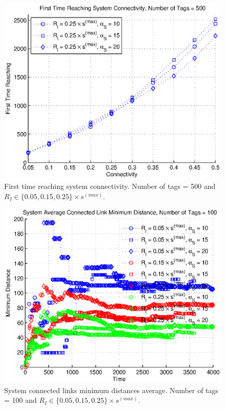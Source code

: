 \begin{figure}
\centering
\includegraphics[width=5in]{Chapter_4_Figures/sys_first_time_connect_500tags.eps}
\caption{First time reaching system connectivity. Number of tags = 500 and $R_I \in \{0.05, 0.15, 0.25\} \times s^{(max)}$.}
\label{Figure: sys_first_time_connect_500tags.eps}
\end{figure}
\begin{figure}
\centering
\includegraphics[width=5in]{Chapter_4_Figures/sys_links_min_dist_100tags_all.eps}
\caption{System connected links minimum distances average. Number of tags = 100 and $R_I \in \{0.05, 0.15, 0.25\} \times s^{(max)}$.}
\label{Figure: sys_links_min_dist_100tags_all.eps}
\end{figure}
\clearpage

